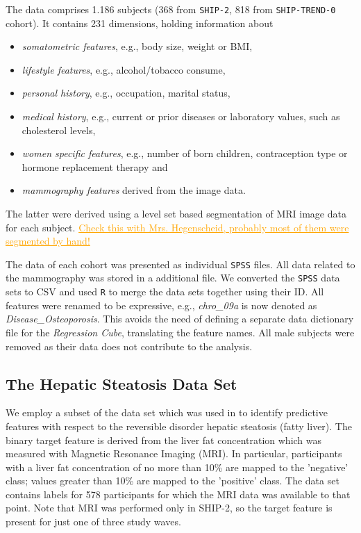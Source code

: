 \documentclass[journal]{style/vgtc} 			          %
\newcommand{\com}[1]{\textcolor{orange}{\uline{#1}}}
\begin{document}
The data comprises 1.186 subjects (368 from \texttt{SHIP-2}, 818 from \texttt{SHIP-TREND-0} cohort).
It contains 231 dimensions, holding information about
\begin{itemize}
	\item \emph{somatometric features}, e.g., body size, weight or BMI, 
	\item \emph{lifestyle features}, e.g., alcohol/tobacco consume, 
	\item \emph{personal history}, e.g., occupation, marital status,
	\item \emph{medical history}, e.g., current or prior diseases or laboratory values, such as cholesterol levels,
	\item \emph{women specific features}, e.g., number of born children, contraception type or hormone replacement therapy and
	\item \emph{mammography features} derived from the image data.
\end{itemize}
The latter were derived using a level set based segmentation \cite{Ivanovska2014} of MRI image data for each subject.
\com{Check this with Mrs. Hegenscheid, probably most of them were segmented by hand!}

The data of each cohort was presented as individual \texttt{SPSS} files.
All data related to the mammography was stored in a additional file.
We converted the \texttt{SPSS} data sets to CSV and used \texttt{R} to merge the data sets together using their ID.
All features were renamed to be expressive, e.g., \emph{chro\_09a} is now denoted as \emph{Disease\_Osteoporosis}.
This avoids the need of defining a separate data dictionary file for the \emph{Regression Cube}, translating the feature names.
All male subjects were removed as their data does not contribute to the analysis.
\subsection{The Hepatic Steatosis Data Set}
We employ a subset of the data set which was used in \cite{Niemann2014} to identify predictive features with respect to the reversible disorder hepatic steatosis (fatty liver).
The binary target feature is derived from the liver fat concentration which was measured with Magnetic Resonance Imaging (MRI).
In particular, participants with a liver fat concentration of no more than 10\% are mapped to the 'negative' class; values greater than 10\% are mapped to the 'positive' class.
The data set contains labels for 578 participants for which the MRI data was available to that point.
Note that MRI was performed only in SHIP-2, so the target feature is present for just one of three study waves.
\end{document}
